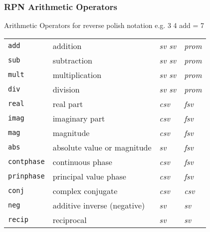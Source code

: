 \subsubsection{RPN Arithmetic Operators}
Arithmetic Operators for reverse polish notation
e.g. 3 4 add = 7

\begin{tabular}{p{.8in}p{2.5in}p{1.0in}p{.75in}}
{\tt add} & addition & {\it sv \newline sv} & {\it prom} \\
{\tt sub} & subtraction & {\it sv \newline sv} & {\it prom} \\
{\tt mult} & multiplication & {\it sv \newline sv} & {\it prom} \\
{\tt div} & division & {\it sv \newline sv} & {\it prom} \\
{\tt real} & real part & {\it csv} & {\it fsv} \\
{\tt imag} & imaginary part & {\it csv} & {\it fsv} \\
{\tt mag} & magnitude & {\it csv} & {\it fsv} \\
{\tt abs} & absolute value or magnitude & {\it sv} & {\it fsv} \\
{\tt contphase} & continuous phase & {\it csv} & {\it fsv} \\
{\tt prinphase} & principal value phase & {\it csv} & {\it fsv} \\
{\tt conj} & complex conjugate & {\it csv} & {\it csv} \\
{\tt neg} & additive inverse (negative) & {\it sv} & {\it sv} \\
{\tt recip} & reciprocal & {\it sv} & {\it sv}
\end{tabular}

%

